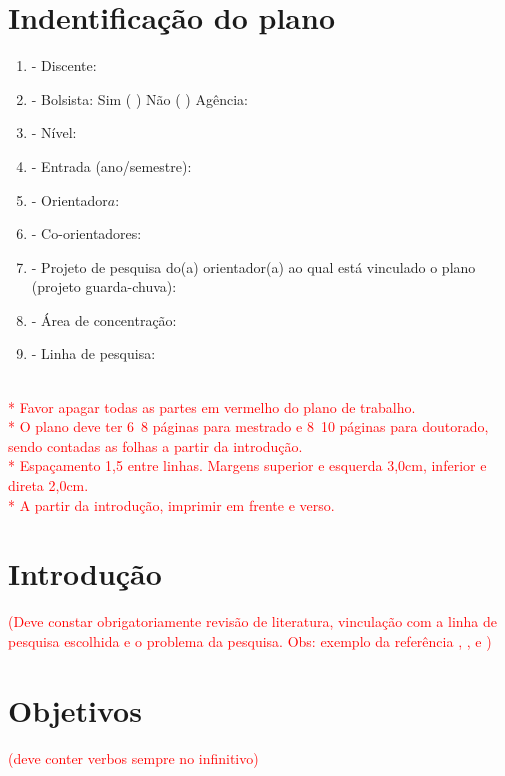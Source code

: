 \documentclass[12pt,a4paper,oneside]{book}
\begin{document}

\thispagestyle{empty}

\frontmatter

\tableofcontents
\pagebreak

\chapter*{Indentifica\c{c}\~{a}o do plano}
\renewcommand{\labelenumi}{\alph{enumi}}
\begin{enumerate}
    \item - Discente:
    \item - Bolsista: Sim ( )  N\~{a}o ( ) Ag\^{e}ncia:
    \item - N\'{i}vel:
    \item - Entrada (ano/semestre):
    \item - Orientador\(a\):
    \item - Co-orientadores:
    \item - Projeto de pesquisa do(a) orientador(a) ao qual est\'{a} vinculado o plano (projeto guarda-chuva):
    \item - \'{A}rea de concentra\c{c}\~{a}o:
    \item - Linha de pesquisa:
\end{enumerate}

\textcolor{red}{\\
* Favor apagar todas as partes em vermelho do plano de trabalho.\\
* O plano deve ter 6~8 p\'{a}ginas para mestrado e 8~10 p\'{a}ginas para doutorado, sendo contadas as folhas a partir da introdu\c{c}\~{a}o.\\
* Espa\c{c}amento 1,5 entre linhas. Margens superior e esquerda 3,0cm, inferior e direta 2,0cm.\\
* A partir da introdu\c{c}\~{a}o, imprimir em frente e verso.}
\pagebreak

\mainmatter

\chapter{Introdu\c{c}\~{a}o}
\textcolor{red}{(Deve constar obrigatoriamente revis\~{a}o de literatura, vincula\c{c}\~{a}o com a linha de pesquisa escolhida e o problema da pesquisa. Obs: exemplo da refer\^{e}ncia \autocite{einstein}, \cite[10]{einstein}, \citeauthor{einstein} e \textcite{einstein})}
\pagebreak

\chapter{Objetivos}
\textcolor{red}{(deve conter verbos sempre no infinitivo)}
\end{document}
